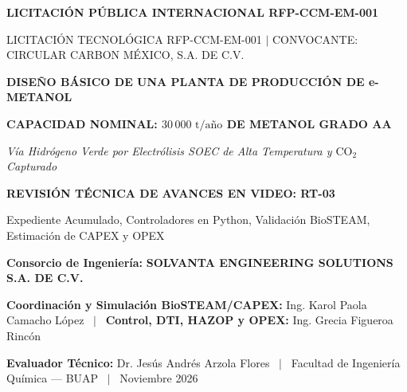 \documentclass[10pt,landscape]{article}
\begin{document}
\begin{tcolorbox}[
  enhanced,
  colback=navyblue,
  colframe=accentcyan,
  arc=3mm,
  boxrule=1.5pt,
  top=6pt,
  bottom=6pt,
  left=12pt,
  right=12pt,
  height=0.88\textheight
]
  \vspace{4pt}
  \begin{center}
    {\fontsize{10pt}{12pt}\selectfont \color{accentcyan}\textbf{LICITACIÓN PÚBLICA INTERNACIONAL RFP-CCM-EM-001}}\par
    \vspace{2pt}
    {\fontsize{8pt}{10pt}\selectfont \color{white!80}LICITACIÓN TECNOLÓGICA RFP-CCM-EM-001 $|$ CONVOCANTE: CIRCULAR CARBON MÉXICO, S.A. DE C.V.}\par
    \vspace{6pt}
    {\fontsize{20pt}{23pt}\selectfont \color{white}\textbf{DISEÑO BÁSICO DE UNA PLANTA DE PRODUCCIÓN DE e-METANOL}}\par
    \vspace{3pt}
    {\fontsize{13pt}{15pt}\selectfont \color{accentcyan}\textbf{CAPACIDAD NOMINAL: $30\,000\text{ t/año}$ DE METANOL GRADO AA}}\par
    \vspace{2pt}
    {\fontsize{9.5pt}{11pt}\selectfont \color{white!90}\textit{Vía Hidrógeno Verde por Electrólisis SOEC de Alta Temperatura y $\text{CO}_2$ Capturado}}\par
    \vspace{8pt}
    
    \begin{tcolorbox}[
      colback=white,
      colframe=accentcyan,
      arc=2mm,
      boxrule=1pt,
      top=4pt,
      bottom=4pt,
      left=10pt,
      right=10pt,
      width=0.92\textwidth
    ]
      \centering
      {\fontsize{10.5pt}{12.5pt}\selectfont \textbf{\color{navyblue}REVISIÓN TÉCNICA DE AVANCES EN VIDEO: RT-03}}\par
      \vspace{2pt}
      {\fontsize{7.8pt}{9.5pt}\selectfont \color{black!80}Expediente Acumulado, Controladores en Python, Validación BioSTEAM, Estimación de CAPEX y OPEX}\par
      \vspace{2pt}
      {\fontsize{7.2pt}{8.5pt}\selectfont \textbf{\color{emeraldgreen}Consorcio de Ingeniería:} \textbf{SOLVANTA ENGINEERING SOLUTIONS S.A. DE C.V.}}\par
      {\fontsize{6.8pt}{8.2pt}\selectfont \textbf{Coordinación y Simulación BioSTEAM/CAPEX:} Ing. Karol Paola Camacho López \ $|$ \ \textbf{Control, DTI, HAZOP y OPEX:} Ing. Grecia Figueroa Rincón}\par
      {\fontsize{6.5pt}{8pt}\selectfont \textbf{Evaluador Técnico:} Dr. Jesús Andrés Arzola Flores \ $|$ \ Facultad de Ingeniería Química --- BUAP \ $|$ \ Noviembre 2026}
    \end{tcolorbox}
    

\end{center}
\end{tcolorbox}
\end{document}
